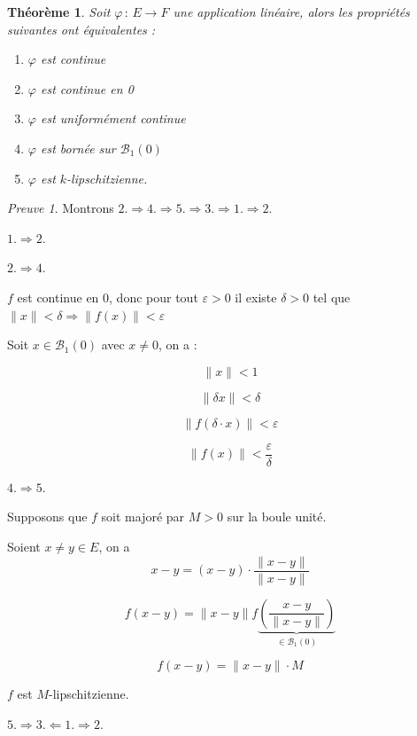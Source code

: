 \documentclass[]{article}
\newtheorem{mythm}{Théorème}
\theoremstyle{remark}
\newtheorem{myproof}{Preuve}
\theoremstyle{definition}
\newcommand{\funcshort}[3]{
#1 \, : \, #2 \longrightarrow #3
}
\newenvironment{proofpart}[1]{
	\leavevmode
	
	\noindent
	{\textit{\textbf{\boldmath #1}}}
	
}{
	\checkmark
}
\begin{document}
\begin{mythm}
	Soit $\funcshort{\varphi}{E}{F}$ une application linéaire, alors les propriétés suivantes ont équivalentes :
	
	\begin{enumerate}
		\item $\varphi$ est continue
		\item $\varphi$ est continue en 0
		\item $\varphi$ est uniformément continue
		\item $\varphi$ est bornée sur $\mathcal{B}_1(0)$
		\item $\varphi$ est $k$-lipschitzienne.
	\end{enumerate}
\end{mythm}


\begin{myproof}
	Montrons $2. \Longrightarrow 4. \Longrightarrow 5. \Longrightarrow 3.\Longrightarrow 1. \Longrightarrow 2.$
	
	\begin{proofpart}{$1. \Longrightarrow 2.$}
	\end{proofpart}
	
	\begin{proofpart}{$2. \Longrightarrow 4.$}
		$f$ est continue en 0, donc pour tout $\varepsilon > 0$ il existe $\delta > 0$ tel que $\|x\| < \delta \Longrightarrow \|f(x)\| < \varepsilon$
		
		Soit $x \in \mathcal{B}_1(0)$ avec $x \neq 0$, on a :
		
		$$\|x\| < 1$$

		$$\|\delta x\| < \delta$$
		
		$$\|f(\delta \cdot x)\| < \varepsilon$$
		
		$$\|f(x)\| < \frac{\varepsilon}{\delta}$$
	\end{proofpart}
	
	\begin{proofpart}{$4. \Longrightarrow 5.$}
		Supposons que $f$ soit majoré par $M > 0$ sur la boule unité.
		
		Soient $x \neq y \in E$, on a
		$$x-y = (x-y) \cdot \frac{\|x-y\|}{\|x-y\|}$$
		
		$$f(x-y) = \|x-y\| f\underbrace{\left(\frac{x-y}{\|x-y\|}\right)}_{\in \mathcal{B}_1(0)}$$
		
		$$f(x-y) = \|x-y\| \cdot M$$
		
		$f$ est $M$-lipschitzienne.
	\end{proofpart}
	
	\begin{proofpart}{$5. \Longrightarrow 3. \Longleftarrow 1. \Longrightarrow 2.$}
	\end{proofpart}
\end{myproof}
\end{document}
